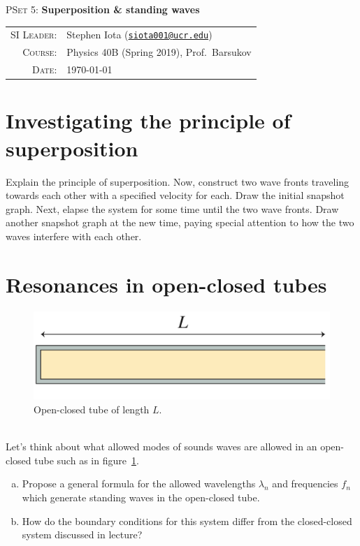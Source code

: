 \documentclass[11pt]{article}
\newcommand{\email}[1]{\texttt{\href{mailto:#1}{#1}}}
\begin{document}
\begin{center}
\Large{\textsc{PSet 5}: \textbf{Superposition \& standing waves}}
\end{center}
\vspace{.5mm}
\begin{tabular}{rl}
\textsc{SI Leader}:			& 			Stephen Iota (\email{siota001@ucr.edu})
\\
\textsc{Course}:				&			Physics 40B (Spring 2019), Prof.~Barsukov
\\
\textsc{Date}:					&			\today
\end{tabular}


\section{Investigating the principle of superposition}

Explain the principle of superposition.
Now, construct two wave fronts traveling towards each other with a specified velocity for each.
Draw the initial snapshot graph.
Next, elapse the system for some time until the two wave fronts.
Draw another snapshot graph at the new time, paying special attention to how the two waves interfere with each other.


\section{Resonances in open-closed tubes}

\begin{figure}[h!]
\centering
\includegraphics[width=.4\linewidth]{PSet5_Fig1}
\caption{Open-closed tube of length $L$.\label{tube}}
\end{figure}
\\
\noindent
Let's think about what allowed modes of sounds waves are allowed in an open-closed tube such as in figure~\ref{tube}.
\begin{enumerate}[(a)]
\item Propose a general formula for the allowed wavelengths $\lambda_n$ and frequencies $f_n$ which generate standing waves in the open-closed tube.
\item How do the boundary conditions for this system differ from the closed-closed system discussed in lecture?
\end{enumerate}
\end{document}
